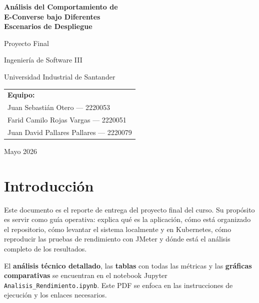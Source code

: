 \documentclass[11pt,a4paper]{article}
\begin{document}
\begin{titlepage}
    \centering
    \vspace*{1.5cm}
    {\huge\bfseries Análisis del Comportamiento de \\[0.3cm] E-Converse bajo Diferentes\\[0.3cm] Escenarios de Despliegue\par}
    \vspace{1cm}
    {\Large Proyecto Final\par}
    \vspace{0.4cm}
    {\large Ingeniería de Software III\par}
    \vspace{2cm}
    {\large Universidad Industrial de Santander\par}
    \vspace{1.5cm}
    \begin{tabular}{l}
        \large\textbf{Equipo:} \\[0.2cm]
        Juan Sebastián Otero --- 2220053 \\
        Farid Camilo Rojas Vargas --- 2220051 \\
        Juan David Pallares Pallares --- 2220079 \\
    \end{tabular}
    \vfill
    {\large Mayo 2026\par}
\end{titlepage}

\tableofcontents
\newpage

\section{Introducción}

Este documento es el reporte de entrega del proyecto final del curso. Su propósito es servir como guía operativa: explica qué es la aplicación, cómo está organizado el repositorio, cómo levantar el sistema localmente y en Kubernetes, cómo reproducir las pruebas de rendimiento con JMeter y dónde está el análisis completo de los resultados.

El \textbf{análisis técnico detallado}, las \textbf{tablas} con todas las métricas y las \textbf{gráficas comparativas} se encuentran en el notebook Jupyter \texttt{Analisis\_Rendimiento.ipynb}. Este PDF se enfoca en las instrucciones de ejecución y los enlaces necesarios.
\end{document}
